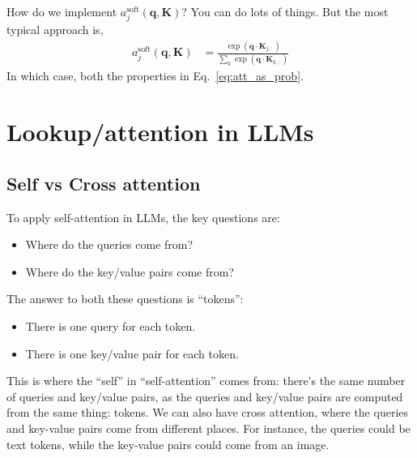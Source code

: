 \documentclass{article}
\begin{document}
How do we implement $a^\text{soft}_j(\mathbf{q}, \mathbf{K})$?
You can do lots of things.
But the most typical approach is,
\begin{align}
  a_j^\text{soft}(\mathbf{q}, \mathbf{K}) &= \frac{\exp(\mathbf{q} \cdot \mathbf{K}_{j, :})}{\sum_k \exp(\mathbf{q} \cdot \mathbf{K}_{k, :})}
\end{align}
In which case, both the properties in Eq.~\eqref{eq:att_as_prob}.

\section{Lookup/attention in LLMs}

\subsection{Self vs Cross attention}

To apply self-attention in LLMs, the key questions are:
\begin{itemize}
  \item Where do the queries come from?
  \item Where do the key/value pairs come from?
\end{itemize}
The answer to both these questions is ``tokens'':
\begin{itemize}
  \item There is one query for each token.
  \item There is one key/value pair for each token.
\end{itemize}
This is where the ``self'' in ``self-attention'' comes from: there's the same number of queries and key/value pairs, as the queries and key/value pairs are computed from the same thing: tokens.
We can also have cross attention, where the queries and key-value pairs come from different places.
For instance, the queries could be text tokens, while the key-value pairs could come from an image.
\end{document}
